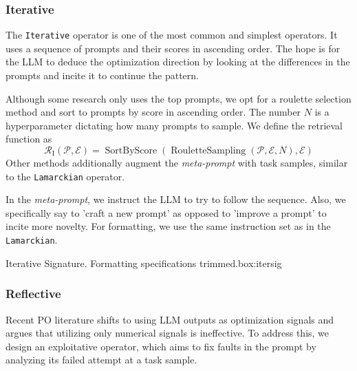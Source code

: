 \subsubsection{Iterative}
The \texttt{Iterative} operator is one of the most common and simplest operators. 
It uses a sequence of prompts and their scores in ascending order.
The hope is for the LLM to deduce the optimization direction by looking at the differences in the prompts and incite it to continue the pattern.

Although some research\cite{yang2024largelanguagemodelsoptimizers} only uses the top prompts, we opt for a roulette selection method
and sort to prompts by score in ascending order. The number $N$ is a hyperparameter dictating how many prompts to sample.
We define the retrieval function as
\begin{equation}
   \mathcal{R}_{\text{I}}(\mathscr{P}, \mathcal{E}) = \operatorname{SortByScore}(\operatorname{RouletteSampling}(\mathscr{P}, \mathcal{E}, N), \mathcal{E})
\end{equation}
Other methods\cite{tang2024unleashingpotentiallargelanguage} additionally augment the \textit{meta-prompt} with task samples, similar to the \texttt{Lamarckian} operator.

In the \textit{meta-prompt}, we instruct the LLM to try to follow the sequence. Also, we specifically say to 'craft a new prompt'
as opposed to 'improve a prompt' to incite more novelty. For formatting, we use the same instruction set as in the \texttt{Lamarckian}.
\begin{figurebox}{Iterative Signature. Formatting specifications trimmed.}{box:itersig}
\end{figurebox}

\subsubsection{Reflective}
Recent PO literature\cite{xiang2025selfsupervisedpromptoptimization} shifts to using LLM outputs as optimization signals
and argues that utilizing only numerical signals is ineffective. To address this, we design an exploitative operator, which
aims to fix faults in the prompt by analyzing its failed attempt at a task sample. 

